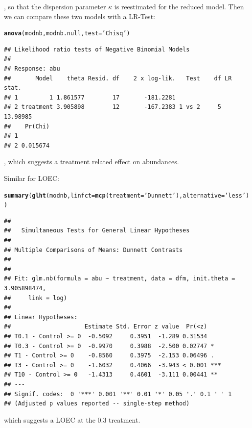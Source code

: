 \documentclass{scrartcl}\usepackage[]{graphicx}\usepackage[]{color}
\makeatletter
\newcommand{\hlstr}[1]{\textcolor[rgb]{0.192,0.494,0.8}{#1}}%
\newcommand{\hlstd}[1]{\textcolor[rgb]{0.345,0.345,0.345}{#1}}%
\newcommand{\hlkwc}[1]{\textcolor[rgb]{0.333,0.667,0.333}{#1}}%
\newcommand{\hlkwd}[1]{\textcolor[rgb]{0.737,0.353,0.396}{\textbf{#1}}}%
\newenvironment{kframe}{%
 \def\at@end@of@kframe{}%
 \ifinner\ifhmode%
  \def\at@end@of@kframe{\end{minipage}}%
  \begin{minipage}{\columnwidth}%
 \fi\fi%
 \def\FrameCommand##1{\hskip\@totalleftmargin \hskip-\fboxsep
 \colorbox{shadecolor}{##1}\hskip-\fboxsep
     \hskip-\linewidth \hskip-\@totalleftmargin \hskip\columnwidth}%
 \MakeFramed {\advance\hsize-\width
   \@totalleftmargin\z@ \linewidth\hsize
   \@setminipage}}%
 {\par\unskip\endMakeFramed%
 \at@end@of@kframe}
\newenvironment{knitrout}{}{} %
\makeatother
\begin{document}
, so that the dispersion parameter $\kappa$ is reestimated for the reduced model.
Then we can compare these two models with a LR-Test:
\begin{knitrout}
\color{fgcolor}\begin{kframe}
\begin{alltt}
\hlkwd{anova}\hlstd{(modnb, modnb.null,} \hlkwc{test} \hlstd{=} \hlstr{'Chisq'}\hlstd{)}
\end{alltt}
\begin{verbatim}
## Likelihood ratio tests of Negative Binomial Models
## 
## Response: abu
##       Model    theta Resid. df    2 x log-lik.   Test    df LR stat.
## 1         1 1.861577        17       -181.2281                      
## 2 treatment 3.905898        12       -167.2383 1 vs 2     5 13.98985
##    Pr(Chi)
## 1         
## 2 0.015674
\end{verbatim}
\end{kframe}
\end{knitrout}
, which suggests a treatment related effect on abundances.

Similar for LOEC:
\begin{knitrout}
\color{fgcolor}\begin{kframe}
\begin{alltt}
\hlkwd{summary}\hlstd{(}\hlkwd{glht}\hlstd{(modnb,} \hlkwc{linfct} \hlstd{=} \hlkwd{mcp}\hlstd{(}\hlkwc{treatment} \hlstd{=} \hlstr{'Dunnett'}\hlstd{),}  \hlkwc{alternative} \hlstd{=} \hlstr{'less'}\hlstd{))}
\end{alltt}
\begin{verbatim}
## 
## 	 Simultaneous Tests for General Linear Hypotheses
## 
## Multiple Comparisons of Means: Dunnett Contrasts
## 
## 
## Fit: glm.nb(formula = abu ~ treatment, data = dfm, init.theta = 3.905898474, 
##     link = log)
## 
## Linear Hypotheses:
##                     Estimate Std. Error z value  Pr(<z)    
## T0.1 - Control >= 0  -0.5092     0.3951  -1.289 0.31534    
## T0.3 - Control >= 0  -0.9970     0.3988  -2.500 0.02747 *  
## T1 - Control >= 0    -0.8560     0.3975  -2.153 0.06496 .  
## T3 - Control >= 0    -1.6032     0.4066  -3.943 < 0.001 ***
## T10 - Control >= 0   -1.4313     0.4601  -3.111 0.00441 ** 
## ---
## Signif. codes:  0 '***' 0.001 '**' 0.01 '*' 0.05 '.' 0.1 ' ' 1
## (Adjusted p values reported -- single-step method)
\end{verbatim}
\end{kframe}
\end{knitrout}
which suggests a LOEC at the 0.3 treatment.
\end{document}
